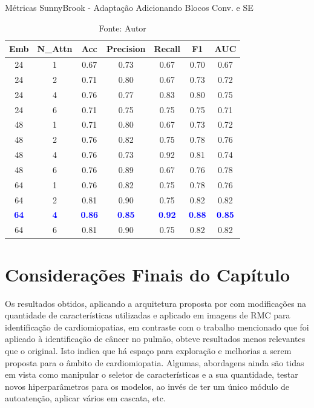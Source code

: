 \begin{table}[htbp]
\centering
\caption{Métricas SunnyBrook - Adaptação Adicionando Blocos Conv. e SE}
\begin{tabular}{ccccccc}
\toprule
\textbf{Emb} & \textbf{N\_Attn} & \textbf{Acc} & \textbf{Precision} & \textbf{Recall} & \textbf{F1} & \textbf{AUC} \\
\midrule
24 & 1 & 0.67 & 0.73 & 0.67 & 0.70 & 0.67 \\
24 & 2 & 0.71 & 0.80 & 0.67 & 0.73 & 0.72 \\
24 & 4 & 0.76 & 0.77 & 0.83 & 0.80 & 0.75 \\
24 & 6 & 0.71 & 0.75 & 0.75 & 0.75 & 0.71 \\
48 & 1 & 0.71 & 0.80 & 0.67 & 0.73 & 0.72 \\
48 & 2 & 0.76 & 0.82 & 0.75 & 0.78 & 0.76 \\
48 & 4 & 0.76 & 0.73 & 0.92 & 0.81 & 0.74 \\
48 & 6 & 0.76 & 0.89 & 0.67 & 0.76 & 0.78 \\
64 & 1 & 0.76 & 0.82 & 0.75 & 0.78 & 0.76 \\
64 & 2 & 0.81 & 0.90 & 0.75 & 0.82 & 0.82 \\
\textcolor{blue}{\textbf{64}} & \textcolor{blue}{\textbf{4}} & \textcolor{blue}{\textbf{0.86}} & \textcolor{blue}{\textbf{0.85}} & \textcolor{blue}{\textbf{0.92}} & \textcolor{blue}{\textbf{0.88}} & \textcolor{blue}{\textbf{0.85}} \\
64 & 6 & 0.81 & 0.90 & 0.75 & 0.82 & 0.82 \\
\bottomrule
\end{tabular}
\caption*{Fonte: Autor}
\label{tab:metrics_sunny_se}
\end{table}

\section{Considerações Finais do Capítulo} 
\label{sec:cap6_consideracoes_finais}

Os resultados obtidos, aplicando a arquitetura proposta por  com modificações na quantidade de características utilizadas e aplicado em imagens de \gls{RMC} para identificação de cardiomiopatias, em contraste com o trabalho mencionado que foi aplicado à identificação de câncer no pulmão, obteve resultados menos relevantes que o original. Isto indica que há espaço para exploração e melhorias a serem proposta para o âmbito de cardiomiopatia. Algumas, abordagens ainda são tidas em vista como manipular o seletor de características e a sua quantidade, testar novos hiperparâmetros para os modelos, ao invés de ter um único módulo de autoatenção, aplicar vários em cascata, etc.


